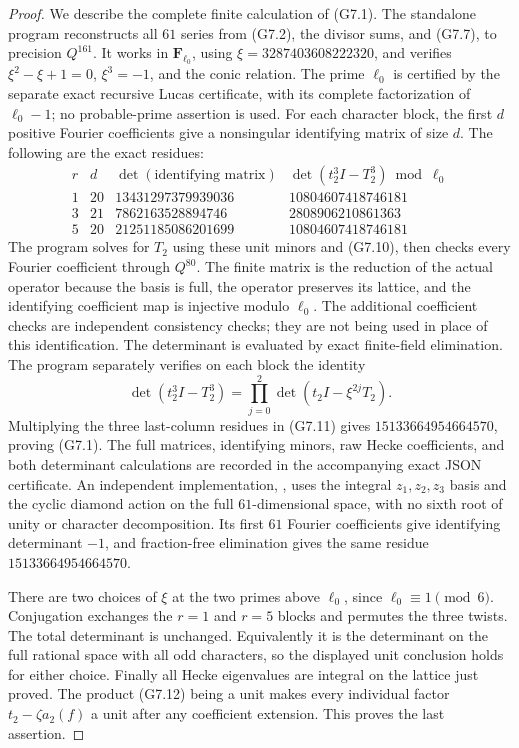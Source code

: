\documentclass[11pt,a4paper]{article}
\theoremstyle{definition}
\begin{document}
\begin{proof}
We describe the complete finite calculation of (G7.1).
The standalone program
reconstructs all \(61\) series from (G7.2), the divisor sums,
and (G7.7), to precision \(Q^{161}\).
It works in \(\mathbf F_{\ell_0}\), using
\(\xi=3287403608222320\), and verifies
\(\xi^2-\xi+1=0\), \(\xi^3=-1\), and the conic relation.
The prime \(\ell_0\) is certified by the separate exact
recursive Lucas certificate, with its complete factorization
of \(\ell_0-1\); no probable-prime assertion is used.
For each character block, the first \(d\) positive
Fourier coefficients give a nonsingular identifying matrix
of size \(d\). The following are the exact residues:
\[
\begin{array}{c|r|r|r}
 r&d&\det(\text{identifying matrix})
       &\det(t_2^3I-T_2^3)\bmod\ell_0\\ \hline
 1&20&13431297379939036&10804607418746181\\
 3&21& 7862163528894746& 2808906210861363\\
 5&20&21251185086201699&10804607418746181
\end{array}
 \tag{G7.11}
\]
The program solves for \(T_2\) using these unit minors and
(G7.10), then checks every Fourier coefficient through
\(Q^{80}\). The finite matrix is the reduction of the actual
operator because the basis is full, the operator preserves
its lattice, and the identifying coefficient map is
injective modulo \(\ell_0\). The additional coefficient
checks are independent consistency checks; they are not
being used in place of this identification.
The determinant is evaluated by exact finite-field
elimination. The program separately verifies on each
block the identity
\[
 \det(t_2^3I-T_2^3)
  =\prod_{j=0}^2\det(t_2I-\xi^{2j}T_2).
 \tag{G7.12}
\]
Multiplying the three last-column residues in (G7.11)
gives \(15133664954664570\), proving (G7.1).
The full matrices, identifying minors, raw Hecke
coefficients, and both determinant calculations are
recorded in the accompanying exact JSON certificate.
An independent implementation,
,
uses the integral \(z_1,z_2,z_3\) basis and the cyclic
diamond action on the full \(61\)-dimensional space, with
no sixth root of unity or character decomposition. Its
first \(61\) Fourier coefficients give identifying
determinant \(-1\), and fraction-free elimination gives
the same residue \(15133664954664570\).

There are two choices of \(\xi\) at the two primes above
\(\ell_0\), since \(\ell_0\equiv1\pmod6\).
Conjugation exchanges the \(r=1\) and \(r=5\) blocks
and permutes the three twists. The total determinant is
unchanged. Equivalently it is the determinant on the full
rational space with all odd characters, so the displayed
unit conclusion holds for either choice.
Finally all Hecke eigenvalues are integral on the lattice
just proved. The product (G7.12) being a unit makes every
individual factor \(t_2-\zeta a_2(f)\) a unit after any
coefficient extension. This proves the last assertion.
\end{proof}
\end{document}
